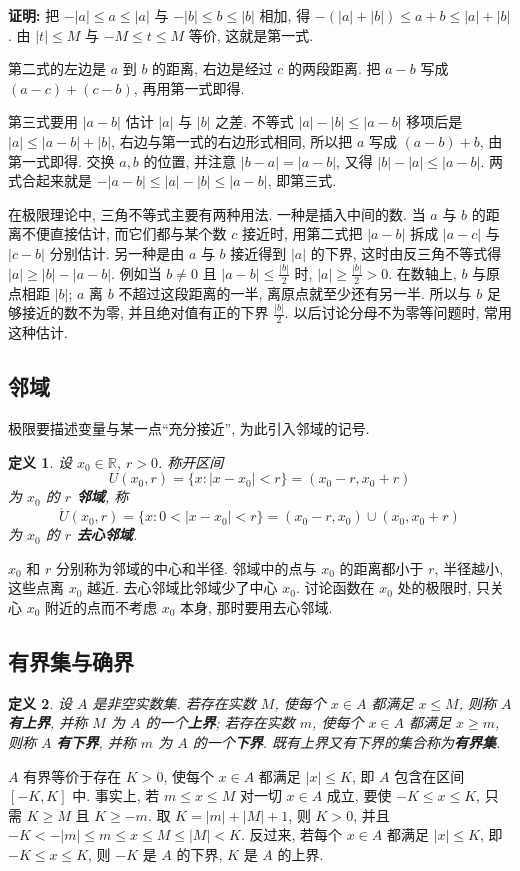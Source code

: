\documentclass[UTF8,openany]{ctexbook}
\theoremstyle{chinesetextbook}
\newtheorem{definition}{定义}[section]
\newenvironment{cnproof}{\par\indent\textbf{证明:} \ignorespaces}{\par}
\begin{document}
\begin{cnproof}
把 $-|a|\le a\le|a|$ 与 $-|b|\le b\le|b|$ 相加, 得 $-(|a|+|b|)\le a+b\le|a|+|b|$. 由 $|t|\le M$ 与 $-M\le t\le M$ 等价, 这就是第一式.

第二式的左边是 $a$ 到 $b$ 的距离, 右边是经过 $c$ 的两段距离. 把 $a-b$ 写成 $(a-c)+(c-b)$, 再用第一式即得.

第三式要用 $|a-b|$ 估计 $|a|$ 与 $|b|$ 之差. 不等式 $|a|-|b|\le|a-b|$ 移项后是 $|a|\le|a-b|+|b|$, 右边与第一式的右边形式相同, 所以把 $a$ 写成 $(a-b)+b$, 由第一式即得. 交换 $a,b$ 的位置, 并注意 $|b-a|=|a-b|$, 又得 $|b|-|a|\le|a-b|$. 两式合起来就是 $-|a-b|\le|a|-|b|\le|a-b|$, 即第三式.
\end{cnproof}
在极限理论中, 三角不等式主要有两种用法. 一种是插入中间的数. 当 $a$ 与 $b$ 的距离不便直接估计, 而它们都与某个数 $c$ 接近时, 用第二式把 $|a-b|$ 拆成 $|a-c|$ 与 $|c-b|$ 分别估计. 另一种是由 $a$ 与 $b$ 接近得到 $|a|$ 的下界, 这时由反三角不等式得 $|a|\ge|b|-|a-b|$. 例如当 $b\ne0$ 且 $\displaystyle|a-b|\le\frac{|b|}2$ 时, $\displaystyle|a|\ge\frac{|b|}2>0$. 在数轴上, $b$ 与原点相距 $|b|$; $a$ 离 $b$ 不超过这段距离的一半, 离原点就至少还有另一半. 所以与 $b$ 足够接近的数不为零, 并且绝对值有正的下界 $\displaystyle\frac{|b|}2$. 以后讨论分母不为零等问题时, 常用这种估计.
\subsection{邻域}
极限要描述变量与某一点“充分接近”, 为此引入邻域的记号.
\begin{definition}
设 $x_0\in\mathbb R$, $r>0$. 称开区间
\[
U(x_0,r)=\{x:|x-x_0|<r\}=(x_0-r,x_0+r)
\]
为 $x_0$ 的 \textbf{$r$ 邻域}, 称
\[
\mathring U(x_0,r)=\{x:0<|x-x_0|<r\}=(x_0-r,x_0)\cup(x_0,x_0+r)
\]
为 $x_0$ 的 \textbf{$r$ 去心邻域}.
\end{definition}
$x_0$ 和 $r$ 分别称为邻域的中心和半径. 邻域中的点与 $x_0$ 的距离都小于 $r$, 半径越小, 这些点离 $x_0$ 越近. 去心邻域比邻域少了中心 $x_0$. 讨论函数在 $x_0$ 处的极限时, 只关心 $x_0$ 附近的点而不考虑 $x_0$ 本身, 那时要用去心邻域.
\subsection{有界集与确界}
\begin{definition}
设 $A$ 是非空实数集. 若存在实数 $M$, 使每个 $x\in A$ 都满足 $x\le M$, 则称 $A$ \textbf{有上界}, 并称 $M$ 为 $A$ 的一个\textbf{上界}; 若存在实数 $m$, 使每个 $x\in A$ 都满足 $x\ge m$, 则称 $A$ \textbf{有下界}, 并称 $m$ 为 $A$ 的一个\textbf{下界}. 既有上界又有下界的集合称为\textbf{有界集}.
\end{definition}
$A$ 有界等价于存在 $K>0$, 使每个 $x\in A$ 都满足 $|x|\le K$, 即 $A$ 包含在区间 $[-K,K]$ 中. 事实上, 若 $m\le x\le M$ 对一切 $x\in A$ 成立, 要使 $-K\le x\le K$, 只需 $K\ge M$ 且 $K\ge-m$. 取 $K=|m|+|M|+1$, 则 $K>0$, 并且 $-K<-|m|\le m\le x\le M\le|M|<K$. 反过来, 若每个 $x\in A$ 都满足 $|x|\le K$, 即 $-K\le x\le K$, 则 $-K$ 是 $A$ 的下界, $K$ 是 $A$ 的上界.
\end{document}
